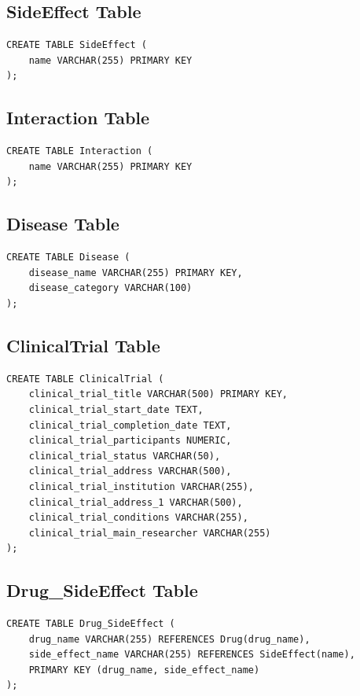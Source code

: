 \documentclass[12pt,a4paper]{article}
\begin{document}
\subsection{SideEffect Table}

\begin{lstlisting}[style=sqlstyle]
CREATE TABLE SideEffect (
    name VARCHAR(255) PRIMARY KEY
);
\end{lstlisting}

\subsection{Interaction Table}

\begin{lstlisting}[style=sqlstyle]
CREATE TABLE Interaction (
    name VARCHAR(255) PRIMARY KEY
);
\end{lstlisting}

\subsection{Disease Table}

\begin{lstlisting}[style=sqlstyle]
CREATE TABLE Disease (
    disease_name VARCHAR(255) PRIMARY KEY,
    disease_category VARCHAR(100)
);
\end{lstlisting}

\subsection{ClinicalTrial Table}

\begin{lstlisting}[style=sqlstyle]
CREATE TABLE ClinicalTrial (
    clinical_trial_title VARCHAR(500) PRIMARY KEY,
    clinical_trial_start_date TEXT,
    clinical_trial_completion_date TEXT,
    clinical_trial_participants NUMERIC,
    clinical_trial_status VARCHAR(50),
    clinical_trial_address VARCHAR(500),
    clinical_trial_institution VARCHAR(255),
    clinical_trial_address_1 VARCHAR(500),
    clinical_trial_conditions VARCHAR(255),
    clinical_trial_main_researcher VARCHAR(255)
);
\end{lstlisting}



\subsection{Drug\_SideEffect Table}

\begin{lstlisting}[style=sqlstyle]
CREATE TABLE Drug_SideEffect (
    drug_name VARCHAR(255) REFERENCES Drug(drug_name),
    side_effect_name VARCHAR(255) REFERENCES SideEffect(name),
    PRIMARY KEY (drug_name, side_effect_name)
);
\end{lstlisting}
\end{document}
